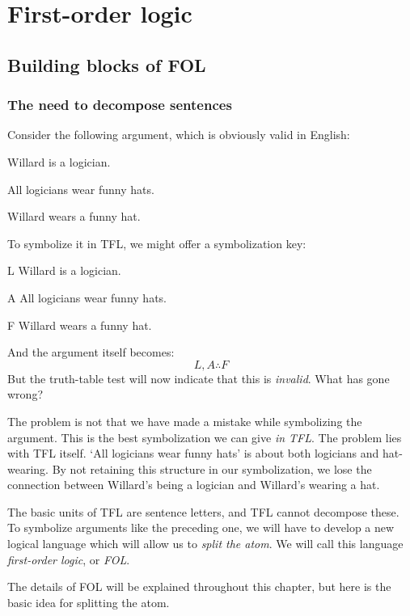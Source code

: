 \part{First-order logic}
\label{ch.FOL}
\chapter{Building blocks of FOL}\label{s:FOLBuildingBlocks}

\section{The need to decompose sentences}
Consider the following argument, which is obviously valid in English:
\begin{earg}
\label{willard1}
\item[] Willard is a logician.
\item[] All logicians wear funny hats.
\item[\therefore] Willard wears a funny hat.
\end{earg}
To symbolize it in TFL, we might offer a symbolization key:
\begin{ekey}
\item[L] Willard is a logician.
\item[A] All logicians wear funny hats.
\item[F] Willard wears a funny hat.
\end{ekey}
And the argument itself becomes:
$$L, A \therefore F$$
But the truth-table test will now indicate that this is \emph{invalid}. What has gone wrong?

The problem is not that we have made a mistake while symbolizing the argument. This is the best symbolization we can give \emph{in TFL}. The problem lies with TFL itself. `All logicians wear funny hats' is about both logicians and hat-wearing. By not retaining this structure in our symbolization, we lose the connection between Willard's being a logician and Willard's wearing a hat.

The basic units of TFL are sentence letters, and TFL cannot decompose these. To symbolize arguments like the preceding one, we will have to develop a new logical language which will allow us to \emph{split the atom}. We will call this language \emph{first-order logic}, or \emph{FOL}.

The details of FOL will be explained throughout this chapter, but here is the basic idea for splitting the atom.

